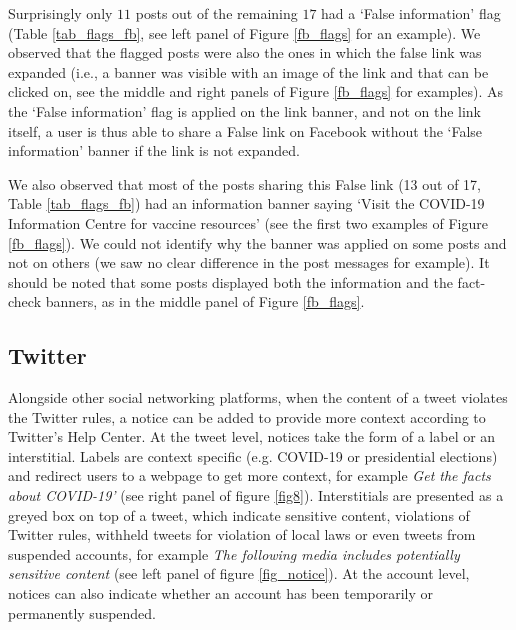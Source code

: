 \documentclass{article}
\begin{document}
Surprisingly only $11$ posts out of the remaining $17$ had a ‘False information’ flag  (Table \ref{tab_flags_fb}, see left panel of Figure \ref{fb_flags} for an example). We observed that the flagged posts were also the ones in which the false link was expanded (i.e., a banner was visible with an image of the link and that can be clicked on, see the middle and right panels of Figure \ref{fb_flags} for examples). As the ‘False information’ flag is applied on the link banner, and not on the link itself, a user is thus able to share a False link on Facebook without the ‘False information’ banner if the link is not expanded.

\smallskip

We also observed that most of the posts sharing this False link (13 out of 17, Table \ref{tab_flags_fb}) had an information banner saying ‘Visit the COVID-19 Information Centre for vaccine resources’ (see the first two examples of Figure \ref{fb_flags}). We could not identify why the banner was applied on some posts and not on others (we saw no clear difference in the post messages for example). It should be noted that some posts displayed both the information and the fact-check banners, as in the middle panel of Figure \ref{fb_flags}.

\subsection{Twitter}

Alongside other social networking platforms, when the content of a tweet violates the Twitter rules, a notice can be added to provide more context according to Twitter's Help Center. At the tweet level, notices take the form of a label or an interstitial. Labels are context specific (e.g. COVID-19 or presidential elections) and  redirect users to a webpage to get more context, for example {\it Get the facts about COVID-19'} (see right panel of figure \ref{fig8}). Interstitials are presented as a greyed box on top of a tweet, which indicate sensitive content, violations of Twitter rules, withheld tweets for violation of local laws or even tweets from suspended accounts, for example {\it The following media includes potentially sensitive content} (see left panel of figure \ref{fig_notice}). At the account level, notices can also indicate whether an account has been temporarily or permanently suspended. 

\end{document}
